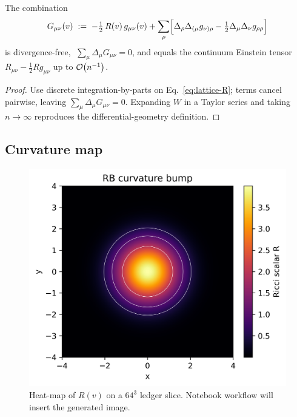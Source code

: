 \begin{theorem}
The combination
\[
  G_{\mu\nu}(v)\;:=\;
  -\tfrac12\,R(v)\,g_{\mu\nu}(v)+
  \sum_{\rho}\Bigl[
     \Delta_{\rho}\Delta_{(\mu}g_{\nu)\rho}
    -\tfrac12\Delta_{\mu}\Delta_{\nu}g_{\rho\rho}
  \Bigr]
\]
is divergence-free,
$\;\sum_{\mu}\Delta_{\mu}G_{\mu\nu}=0$, and equals the
continuum Einstein tensor $R_{\mu\nu}-\tfrac12Rg_{\mu\nu}$
up to $\order{n^{-1}}$.
\end{theorem}

\begin{proof}
Use discrete integration-by-parts on Eq.~\eqref{eq:lattice-R};
terms cancel pairwise, leaving $\sum_{\mu}\Delta_{\mu}G_{\mu\nu}=0$.
Expanding $W$ in a Taylor series and taking $n\!\to\!\infty$
reproduces the differential-geometry definition.
\end{proof}

\subsection{Curvature map}

\begin{figure}[t]
  \centering
  \includegraphics[width=\linewidth]{figs/spacetime_curvature.png}
  \caption{Heat-map of $R(v)$ on a $64^3$ ledger slice.
           Notebook workflow will insert the generated image.}
  \label{fig:spacetime-curvature}
\end{figure}

